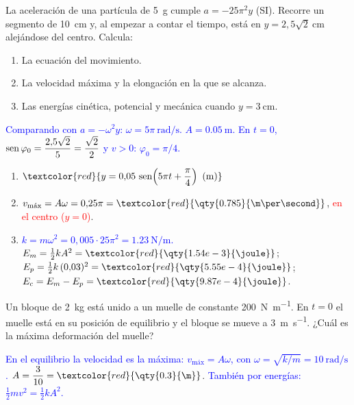 \begin{exercise}
    La aceleración de una partícula de \qty{5}{\g} cumple \(a = -25\pi^2 y\) (SI). Recorre un segmento de \qty{10}{\cm} y, al
    empezar a contar el tiempo, está en \(y = 2{,}5\sqrt 2\ \unit{\cm}\) alejándose del centro. Calcula:
    \begin{enumerate}[label=\letraminuscula]
        \item La ecuación del movimiento.
        \item La velocidad máxima y la elongación en la que se alcanza.
        \item Las energías cinética, potencial y mecánica cuando \(y = \qty{3}{\cm}\).
    \end{enumerate}
    \begin{solu}
        \textcolor{blue}{Comparando con \(a = -\omega^2 y\): \(\omega = 5\pi\ \unit{\radian\per\second}\). \(A = \qty{0.05}{\m}\). En \(t = 0\),
        \(\operatorname{sen}\varphi_0 = \dfrac{2{,}5\sqrt 2}{5} = \dfrac{\sqrt 2}{2}\) y \(v > 0\): \(\varphi_0 = \pi/4\).}
        \begin{enumerate}[label=\letraminuscula]
            \item \(\textcolor{red}{y = 0{,}05\,\sen\!\left(5\pi t + \dfrac{\pi}{4}\right)\ \text{(m)}}\)
            \item \(v_{\text{máx}} = A\omega = 0{,}25\pi = \textcolor{red}{\qty{0.785}{\m\per\second}}\), \textcolor{red}{en el centro (\(y = 0\))}.
            \item \textcolor{blue}{\(k = m\omega^2 = 0{,}005\cdot 25\pi^2 = \qty{1.23}{\newton\per\m}\).}
            \(E_m = \frac{1}{2}kA^2 = \textcolor{red}{\qty{1.54e-3}{\joule}}\); \(E_p = \frac{1}{2}k\,(0{,}03)^2 = \textcolor{red}{\qty{5.55e-4}{\joule}}\);
            \(E_c = E_m - E_p = \textcolor{red}{\qty{9.87e-4}{\joule}}\).
        \end{enumerate}
    \end{solu}
\end{exercise}

\begin{exercise}
    Un bloque de \qty{2}{\kg} está unido a un muelle de constante \qty{200}{\newton\per\m}. En \(t = 0\) el muelle está en
    su posición de equilibrio y el bloque se mueve a \qty{3}{\m\per\second}. ¿Cuál es la máxima deformación del muelle?
    \begin{solu}
        \textcolor{blue}{En el equilibrio la velocidad es la máxima: \(v_{\text{máx}} = A\omega\), con \(\omega = \sqrt{k/m} = \qty{10}{\radian\per\second}\).}
        \(A = \dfrac{3}{10} = \textcolor{red}{\qty{0.3}{\m}}\).
        \textcolor{blue}{También por energías: \(\frac{1}{2}mv^2 = \frac{1}{2}kA^2\).}
    \end{solu}
\end{exercise}

